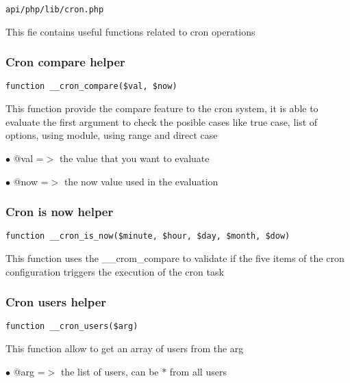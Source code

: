\documentclass[a4paper]{article}
\begin{document}
\begin{lstlisting}
api/php/lib/cron.php
\end{lstlisting}

This fie contains useful functions related to cron operations

\hypertarget{toc402}{}
\subsubsection{Cron compare helper}

\begin{lstlisting}
function __cron_compare($val, $now)
\end{lstlisting}

This function provide the compare feature to the cron system, it is able to
evaluate the first argument to check the posible cases like true case, list
of options, using module, using range and direct case

\begin{compactitem}
\item[\color{myblue}$\bullet$] @val =$>$ the value that you want to evaluate
\item[\color{myblue}$\bullet$] @now =$>$ the now value used in the evaluation
\end{compactitem}

\hypertarget{toc403}{}
\subsubsection{Cron is now helper}

\begin{lstlisting}
function __cron_is_now($minute, $hour, $day, $month, $dow)
\end{lstlisting}

This function uses the \_\_crom\_compare to validate if the five items of the
cron configuration triggers the execution of the cron task

\hypertarget{toc404}{}
\subsubsection{Cron users helper}

\begin{lstlisting}
function __cron_users($arg)
\end{lstlisting}

This function allow to get an array of users from the arg

\begin{compactitem}
\item[\color{myblue}$\bullet$] @arg =$>$ the list of users, can be * from all users
\end{compactitem}
\end{document}
